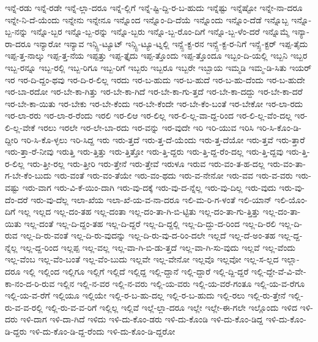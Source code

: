 {ಇನ್ನೆ-ರಡು
ಇನ್ನೆ-ರಡೇ
ಇನ್ನೆ-ಲ್ಲಾ-ದರೂ
ಇನ್ನೆ-ಲ್ಲಿಗೆ
ಇನ್ನೆ-ಷ್ಟಿ-ದ್ದಿ-ರ-ಬ-ಹುದು
ಇನ್ನೆಷ್ಟು
ಇನ್ನೆಷ್ಟೋ
ಇನ್ನೇ-ನಾ-ದರೂ
ಇನ್ನೇ-ನಿ-ದೆ-ಯೆಂದು
ಇನ್ನೇನು
ಇನ್ನೇನೂ
ಇನ್ನೊಂದ
ಇನ್ನೊಂ-ದಿ-ದೆಯೆ
ಇನ್ನೊಂದು
ಇನ್ನೊಂ-ದೆಡೆ
ಇನ್ನೊಬ್ಬ
ಇನ್ನೊ-ಬ್ಬ-ನನ್ನು
ಇನ್ನೊ-ಬ್ಬರ
ಇನ್ನೊ-ಬ್ಬ-ರನ್ನು
ಇನ್ನೊ-ಬ್ಬರು
ಇನ್ನೊ-ಬ್ಬ-ರೊಂ-ದಿಗೆ
ಇನ್ನೊ-ಬ್ಬ-ಳೆಂ-ದರೆ
ಇನ್ನೊಮ್ಮೆ
ಇನ್ಯಾ-ರಾ-ದರೂ
ಇನ್ಯಾರೋ
ಇನ್ಯಾವ
ಇನ್ಸ್ಟಿ-ಟ್ಯೂಟ್
ಇನ್ಸ್ಟಿ-ಟ್ಯೂ-ಟ್ನಲ್ಲಿ
ಇನ್ಸ್ಪೆ-ಕ್ಟ-ರನ
ಇನ್ಸ್ಪೆ-ಕ್ಟ-ರ-ನಿಗೆ
ಇನ್ಸ್ಪೆ-ಕ್ಟರ್
ಇಪ್ಪ-ತೈದು
ಇಪ್ಪ-ತ್ತ-ನಾಲ್ಕು
ಇಪ್ಪ-ತ್ತ-ನೆಯ
ಇಪ್ಪತ್ತು
ಇಪ್ಪ-ತ್ತೈದು
ಇಪ್ಪ-ತ್ತೊಂದು
ಇಪ್ಪ-ತ್ತೊಂದೂ
ಇಬ್ಬಂ-ದಿ-ಯಲ್ಲಿ
ಇಬ್ಬನಿ
ಇಬ್ಬರ
ಇಬ್ಬ-ರನ್ನೂ
ಇಬ್ಬ-ರಲ್ಲಿ
ಇಬ್ಬ-ರಿಗೂ
ಇಬ್ಬ-ರಿಗೆ
ಇಬ್ಬರು
ಇಬ್ಬರೂ
ಇಬ್ಬರೇ
ಇಬ್ಬಾಯ
ಇಮ್ಮಡಿ
ಇಮ್ಮ-ಡಿ-ಸಿತು
ಇಯರ್
ಇರ
ಇರ-ದಿ-ದ್ದಂ-ಥವು
ಇರ-ದಿ-ರ-ಲಿಲ್ಲ
ಇರದು
ಇರ-ಬ-ಹುದು
ಇರ-ಬ-ಹುದೆ
ಇರ-ಬ-ಹು-ದೆಂದು
ಇರ-ಬ-ಹುದೇ
ಇರ-ಬಾ-ರದೋ
ಇರ-ಬೇ-ಕಾ-ಗಿತ್ತು
ಇರ-ಬೇ-ಕಾ-ಗಿದೆ
ಇರ-ಬೇ-ಕಾ-ಗು-ತ್ತದೆ
ಇರ-ಬೇ-ಕಾ-ದದ್ದು
ಇರ-ಬೇ-ಕಾ-ದರೆ
ಇರ-ಬೇ-ಕಾ-ಯಿತು
ಇರ-ಬೇಕು
ಇರ-ಬೇ-ಕೆಂದು
ಇರ-ಬೇ-ಕೆಂದೇ
ಇರ-ಬೇ-ಕೆಂ-ಬಂತೆ
ಇರ-ಬೇಕೋ
ಇರ-ಲಾ-ರದು
ಇರ-ಲಾ-ರರು
ಇರ-ಲಾ-ರ-ರೆಂದು
ಇರಲಿ
ಇರ-ಲಿಆ
ಇರ-ಲಿಲ್ಲ
ಇರ-ಲಿ-ಲ್ಲ-ವಾ-ದ್ದ-ರಿಂದ
ಇರ-ಲಿ-ಲ್ಲ-ವೆಂ-ದಲ್ಲ
ಇರ-ಲಿ-ಲ್ಲ-ವೇಕೆ
ಇರಲು
ಇರಲೇ
ಇರ-ಲೇ-ಬಾ-ರದು
ಇರ-ವನ್ನು
ಇರ-ವುದೇ
ಇರಿ
ಇರಿ-ಯುವ
ಇರಿಸಿ
ಇರಿ-ಸಿ-ಕೊಂ-ಡಿ-ದ್ದೀರಿ
ಇರಿ-ಸಿ-ಕೊ-ಳ್ಳಲು
ಇರಿ-ಸಿದ್ದ
ಇರು
ಇರು-ತ್ತದೆ
ಇರು-ತ್ತ-ದೆ-ಯೆಂದು
ಇರು-ತ್ತ-ದೆಯೋ
ಇರು-ತ್ತವೆ
ಇರು-ತ್ತಾರೆ
ಇರು-ತ್ತಾ-ರೆ-ನೀವು
ಇರುತ್ತಿ
ಇರು-ತ್ತಿತ್ತು
ಇರು-ತ್ತಿತ್ತೋ
ಇರು-ತ್ತಿ-ದ್ದರು
ಇರು-ತ್ತಿ-ದ್ದ-ರೆಂ-ದಲ್ಲ
ಇರು-ತ್ತಿ-ದ್ದವು
ಇರು-ತ್ತಿ-ರ-ಲಿಲ್ಲ
ಇರು-ತ್ತೀ-ರಲ್ಲ
ಇರು-ತ್ತೀರಿ
ಇರು-ತ್ತೇನೆ
ಇರು-ತ್ತೇವೆ
ಇರುಳೂ
ಇರುವ
ಇರು-ವಂ-ತ-ಹ-ದಲ್ಲ
ಇರು-ವಂ-ತಾ-ಗ-ಬೇ-ಕೆಂ-ಬುದು
ಇರು-ವಂತೆ
ಇರು-ವಂ-ತೆಯೇ
ಇರು-ವಂ-ಥದು
ಇರು-ವ-ನೇನೋ
ಇರು-ವವ
ಇರು-ವ-ವರು
ಇರು-ವಷ್ಟು
ಇರು-ವಾಗ
ಇರು-ವಿ-ಕೆ-ಯಿಂ-ದಾಗಿ
ಇರು-ವು-ದಕ್ಕೆ
ಇರು-ವು-ದ-ನ್ನೆಲ್ಲ
ಇರು-ವು-ದಿಲ್ಲ
ಇರು-ವುದು
ಇರು-ವು-ದೆಂ-ದರೆ
ಇರು-ವು-ದೆಲ್ಲ
ಇಲಾ-ಖೆಯ
ಇಲಾ-ಖೆ-ಯ-ವ-ನಾ-ದರೂ
ಇಲಿ-ಮ-ರಿ-ಗ-ಳಂತೆ
ಇಲಿ-ಯಾನ್
ಇಲಿ-ಯೊಂ-ದಿಗೆ
ಇಲ್ಲ
ಇಲ್ಲದ
ಇಲ್ಲ-ದಂ-ತಹ
ಇಲ್ಲ-ದಂತಾ
ಇಲ್ಲ-ದಂ-ತಾ-ಗಿ-ಬಿ-ಟ್ಟಿತು
ಇಲ್ಲ-ದಂ-ತಾ-ಗು-ತ್ತಿತ್ತು
ಇಲ್ಲ-ದಂ-ತಾ-ಯಿತು
ಇಲ್ಲ-ದಂತೆ
ಇಲ್ಲ-ದಿ-ದ್ದಂ-ತಹ
ಇಲ್ಲ-ದಿ-ದ್ದರೆ
ಇಲ್ಲ-ದಿ-ದ್ದಲ್ಲಿ
ಇಲ್ಲ-ದಿ-ದ್ದು-ದ-ರಿಂದ
ಇಲ್ಲ-ದಿ-ರಲಿ
ಇಲ್ಲ-ದಿ-ರುವ
ಇಲ್ಲ-ದಿ-ರು-ವಂತೆ
ಇಲ್ಲ-ದಿ-ರು-ವುದನ್ನು
ಇಲ್ಲ-ದಿ-ರು-ವು-ದ-ರಿಂ-ದಲೇ
ಇಲ್ಲದೆ
ಇಲ್ಲ-ದೆ-ಅಂ-ತಹ
ಇಲ್ಲ-ದ್ದ-ನ್ನೆಲ್ಲ
ಇಲ್ಲ-ದ್ದ-ರಿಂದ
ಇಲ್ಲಪ್ಪ
ಇಲ್ಲ-ವಲ್ಲ
ಇಲ್ಲ-ವಾ-ಗಿ-ಬಿ-ಡು-ತ್ತದೆ
ಇಲ್ಲ-ವಾ-ಗಿ-ಸು-ವುದು
ಇಲ್ಲವೆ
ಇಲ್ಲ-ವೆಂದು
ಇಲ್ಲ-ವೆಂಬ
ಇಲ್ಲ-ವೆಂ-ಬಂತೆ
ಇಲ್ಲ-ವೆಂ-ಬುದು
ಇಲ್ಲವೇ
ಇಲ್ಲ-ವೇನೋ
ಇಲ್ಲವೊ
ಇಲ್ಲವೋ
ಇಲ್ಲ-ಸ-ಲ್ಲದ
ಇಲ್ಲಾ-ದರೂ
ಇಲ್ಲಿ
ಇಲ್ಲಿಂದ
ಇಲ್ಲಿಗೂ
ಇಲ್ಲಿಗೆ
ಇಲ್ಲಿದೆ
ಇಲ್ಲಿದ್ದ
ಇಲ್ಲಿ-ದ್ದಾನೆ
ಇಲ್ಲಿ-ದ್ದಾರೆ
ಇಲ್ಲಿ-ದ್ದಿ-ದ್ದರೆ
ಇಲ್ಲಿ-ದ್ದೇ-ವೆ-ವಿ-ವೇ-ಕಾ-ನಂ-ದ-ರಿ-ರುವ
ಇಲ್ಲಿನ
ಇಲ್ಲಿ-ನ-ವರ
ಇಲ್ಲಿ-ನ-ವರು
ಇಲ್ಲಿ-ಯ-ವರು
ಇಲ್ಲಿ-ಯ-ವರೆ-ಗಂತೂ
ಇಲ್ಲಿ-ಯ-ವ-ರೆಗೂ
ಇಲ್ಲಿ-ಯ-ವ-ರೆಗೆ
ಇಲ್ಲಿಯೂ
ಇಲ್ಲಿಯೇ
ಇಲ್ಲಿ-ರ-ಬ-ಹು-ದಲ್ಲ
ಇಲ್ಲಿ-ರ-ಬ-ಹುದು
ಇಲ್ಲಿ-ರಲು
ಇಲ್ಲಿ-ರು-ತ್ತೇನೆ
ಇಲ್ಲಿ-ರು-ವ-ವ-ರಲ್ಲಿ
ಇಲ್ಲಿ-ರು-ವ-ವ-ರಿಗೆ
ಇಲ್ಲಿಲ್ಲ
ಇಲ್ಲಿವೆ
ಇಲ್ಲೆ-ಲ್ಲಾ-ದರೂ
ಇಲ್ಲೇ
ಇಲ್ಲೇ-ಈ-ಗಲೇ
ಇಲ್ಲೊಂದು
ಇಳಿದ
ಇಳಿ-ದರು
ಇಳಿ-ದಾಗ
ಇಳಿ-ದಾ-ಗಿದೆ
ಇಳಿದು
ಇಳಿ-ದು-ಕೊಂ-ಡರು
ಇಳಿ-ದು-ಕೊಂಡಿ
ಇಳಿ-ದು-ಕೊಂ-ಡಿದ್ದ
ಇಳಿ-ದು-ಕೊಂ-ಡಿ-ದ್ದರು
ಇಳಿ-ದು-ಕೊಂ-ಡಿ-ದ್ದ-ರೆಂದು
ಇಳಿ-ದು-ಕೊಂ-ಡಿ-ದ್ದರೋ
}
